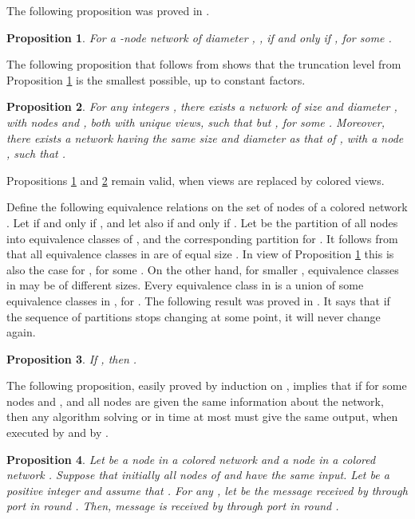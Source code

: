 \documentclass[a4paper,10pt]{article}
\newtheorem{proposition}{Proposition}[section]
\newcommand{\qed}{\hfill  \smallbreak}
\begin{document}
The following proposition was proved in \cite{H}.
\begin{proposition}\label{trunc}
For a -node network of diameter ,
, if and only if ,
for some .
\qed\end{proposition}

The following proposition that follows from \cite{DKP} shows that the truncation level  from Proposition \ref{trunc}
is the smallest possible, up to constant factors.

\begin{proposition}\label{trunc-lower}
For any integers , there exists a network  of size  and diameter , with nodes  and , both with unique views,
such that  but ,
for some .
Moreover, there exists a network  having the same size and diameter as that of , with a node , such that .
 \qed\end{proposition}
 
Propositions \ref{trunc} and \ref{trunc-lower} remain valid, when views are replaced by colored views.

Define the following equivalence relations on the set of nodes of a colored network .
{Let}  if and only if , and {let also}  if and only if .
Let  be the partition of all nodes into equivalence classes of , and  the corresponding partition for  .
It follows from \cite{YK3} that all equivalence classes in  are of equal size . In view of Proposition \ref{trunc}
this is also the case for , for some . On the other hand, for smaller , equivalence classes in  
may be of different sizes.  
Every equivalence class in   is a union of some equivalence classes in  , for .  
The following result was proved in \cite{Norris}. It says that if the sequence of partitions  stops changing at some point, it will never change again. 

\begin{proposition}\label{stop}
If , then .
\qed\end{proposition}

The following proposition, easily proved by induction on , implies that if  for some nodes  and , and all nodes are given the same information about the network, then any algorithm solving  or  in time at most  must give the same output, when executed by  and by .
\begin{proposition} \label{prop:algoView}
Let  be a node in a colored network  and  a node in a colored network .
Suppose that initially all nodes of  and  have the same input.
Let  be a positive integer and assume that .
For any , let  be the message received by  through port  in round .
Then, message  is received by  through port  in round .
\qed
\end{proposition}
\end{document}
